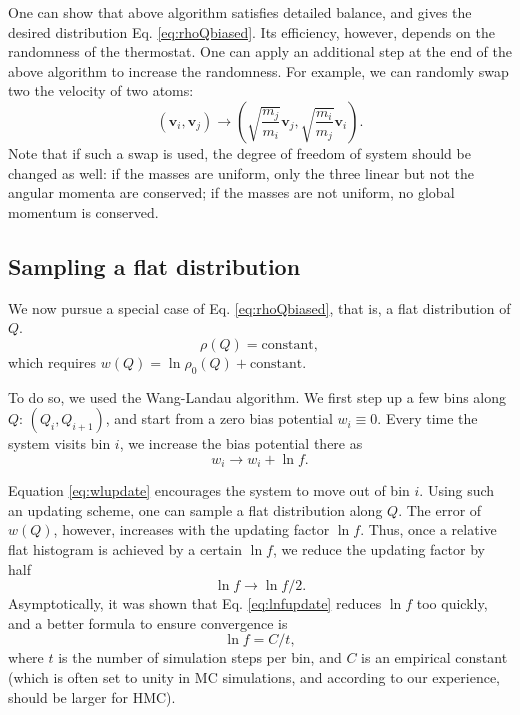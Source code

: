 \documentclass{article}
\newcommand{\vct}[1]{\mathbf{#1}}
\newcommand{\vv}{\vct{v}}
\begin{document}
One can show that above algorithm satisfies detailed balance,
and gives the desired distribution Eq. \eqref{eq:rhoQbiased}.
%
Its efficiency, however, depends on the randomness of the thermostat.
%
One can apply an additional step at the end of the above algorithm
to increase the randomness.
%
For example, we can randomly swap two the velocity of two atoms:
\[
  (\vv_i, \vv_j)
 \rightarrow
  \left(
     \sqrt{ \frac{ m_j } {m_i}  } \vv_j,
     \sqrt{ \frac{ m_i } {m_j}  } \vv_i
  \right).
\]
Note that if such a swap is used,
the degree of freedom of system should be changed as well:
if the masses are uniform,
only the three linear but not the angular momenta are conserved;
if the masses are not uniform,
no global momentum is conserved.



\subsection{Sampling a flat distribution}



We now pursue a special case of Eq. \eqref{eq:rhoQbiased},
that is, a flat distribution of $Q$.
\[
  \rho(Q) = \mbox{constant},
\]
which requires $w(Q) = \ln \rho_0(Q) + \mbox{constant}$.


To do so, we used the Wang-Landau algorithm.
%
We first step up a few bins along $Q$:
$(Q_i, Q_{i+1})$,
and start from a zero bias potential
$w_i \equiv 0$.
%
Every time the system visits bin $i$,
we increase the bias potential there as
\begin{equation}
w_i \rightarrow w_i + \ln f.
\label{eq:wlupdate}
\end{equation}

Equation \eqref{eq:wlupdate} encourages
the system to move out of bin $i$.
%
Using such an updating scheme,
one can sample a flat distribution along $Q$.
%
The error of $w(Q)$, however, increases with
the updating factor $\ln f$.
%
Thus, once a relative flat histogram is achieved
by a certain $\ln f$, we reduce the updating factor
by half
\begin{equation}
  \ln f \rightarrow \ln f / 2.
\label{eq:lnfupdate}
\end{equation}
Asymptotically, it was shown that
Eq. \eqref{eq:lnfupdate} reduces $\ln f$ too quickly,
and a better formula to ensure convergence is
\begin{equation}
  \ln f = C / t,
\end{equation}
where $t$ is the number of simulation steps per bin,
and $C$ is an empirical constant
(which is often set to unity in MC simulations,
and according to our experience, should be larger for HMC).
\end{document}

